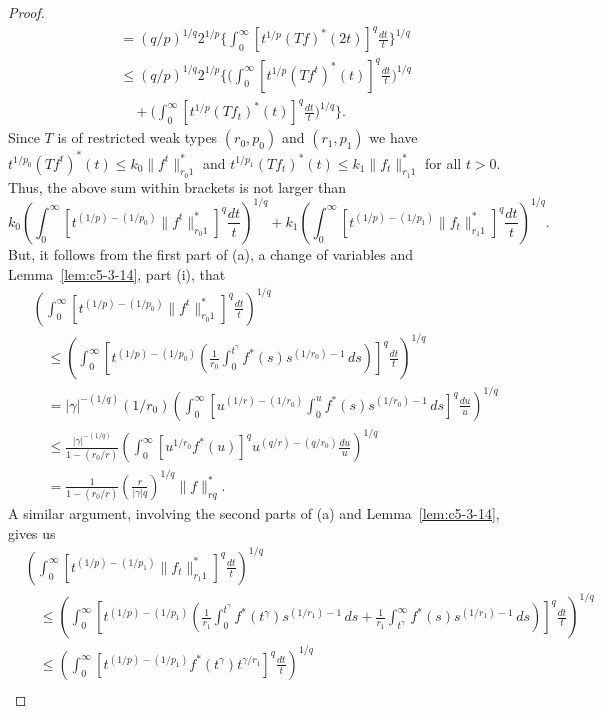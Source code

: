 \begin{proof}
\begin{align*}
&=(q/p)^{1/q}2^{1/p}\Biggl\{\int_{0}^{\infty}[t^{1/p}(Tf)^{*}(2t)]^{q}\frac{dt}{t}\Biggr\}^{1/q}\\
&\leq(q/p)^{1/q}2^{1/p}\Biggl\{\Biggl(\int_{0}^{\infty}[t^{1/p}(Tf^{t})^{*}(t)]^{q}\frac{dt}{t}\Biggr)^{1/q}\\
&\quad+\Biggl(\int_{0}^{\infty}[t^{1/p}(Tf_{t})^{*}(t)]^{q}\frac{dt}{t}\Biggr)^{1/q}\Biggr\}.
\end{align*}
Since $T$ is of restricted weak types $(r_{0}, p_{0})$ and $(r_{1}, p_{1})$ we
have $t^{1/p_{0}}(Tf^{t})^{*}(t) \leq k_{0}\|f^{t}\|_{r_{0}1}^{*}$ and
$t^{1/p_{1}}(Tf_{t})^{*}(t) \leq k_{1}\|f_{t}\|_{r_{1}1}^{*}$ for all $t > 0$.
Thus, the above sum within brackets is not larger than
\[
k_{0}\left(\int_{0}^{\infty}[t^{(1/p)-(1/p_{0})}\|f^{t}\|_{r_{0}1}^{*}]^{q}\frac{dt}{t}\right)^{1/q}
+k_{1}\left(\int_{0}^{\infty}[t^{(1/p)-(1/p_{1})}\|f_{t}\|_{r_{1}1}^{*}]^{q}\frac{dt}{t}\right)^{1/q}.
\]
But, it follows from the first part of (a), a change of variables and
Lemma~\ref{lem:c5-3-14}, part (i), that
\begin{align*}
&\left(\int_{0}^{\infty}[t^{(1/p)-(1/p_{0})}\|f^{t}\|_{r_{0}1}^{*}]^{q}\frac{dt}{t}\right)^{1/q}\\
&\quad\leq\left(\int_{0}^{\infty}\left[t^{(1/p)-(1/p_{0})}\left(\frac{1}{r_{0}}\int_{0}^{t^{\gamma}}f^{*}(s)s^{(1/r_{0})-1}\,ds\right)\right]^{q}\frac{dt}{t}\right)^{1/q}\\
&\quad=|\gamma|^{-(1/q)}(1/r_{0})\left(\int_{0}^{\infty}\left[u^{(1/r)-(1/r_{0})}\int_{0}^{u}f^{*}(s)s^{(1/r_{0})-1}\,ds\right]^{q}\frac{du}{u}\right)^{1/q}\\
&\quad\leq\frac{|\gamma|^{-(1/q)}}{1-(r_{0}/r)}
\left(\int_{0}^{\infty}[u^{1/r_{0}}f^{*}(u)]^{q}u^{(q/r)-(q/r_{0})}\frac{du}{u}\right)^{1/q}\\
&\quad=\frac{1}{1-(r_{0}/r)}\left(\frac{r}{|\gamma|q}\right)^{1/q}\|f\|_{rq}^{*}.
\end{align*}
A similar argument, involving the second parts of (a) and
Lemma~\ref{lem:c5-3-14}, gives us
\begin{align*}
&\left(\int_{0}^{\infty}[t^{(1/p)-(1/p_{1})}\|f_{t}\|_{r_{1}1}^{*}]^{q}\frac{dt}{t}\right)^{1/q}\\
&\quad\leq\left(\int_{0}^{\infty}\left[t^{(1/p)-(1/p_{1})}\left(\frac{1}{r_{1}}\int_{0}^{t^{\gamma}}f^{*}(t^{\gamma})s^{(1/r_{1})-1}\,ds+\frac{1}{r_{1}}\int_{t^{\gamma}}^{\infty}f^{*}(s)s^{(1/r_{1})-1}\,ds\right)\right]^{q}\frac{dt}{t}\right)^{1/q}\\
&\quad\leq\left(\int_{0}^{\infty}[t^{(1/p)-(1/p_{1})}f^{*}(t^{\gamma})t^{\gamma/r_{1}}]^{q}\frac{dt}{t}\right)^{1/q}\\

\end{align*}
\end{proof}
